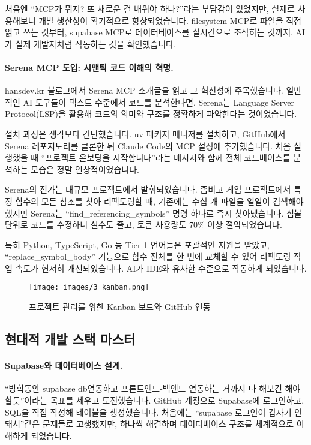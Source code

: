 처음엔 ``MCP가 뭐지? 또 새로운 걸 배워야 하나?''라는 부담감이 있었지만, 실제로 사용해보니 개발 생산성이 획기적으로 향상되었습니다. filesystem MCP로 파일을 직접 읽고 쓰는 것부터, supabase MCP로 데이터베이스를 실시간으로 조작하는 것까지, AI가 실제 개발자처럼 작동하는 것을 확인했습니다.

\paragraph{Serena MCP 도입: 시맨틱 코드 이해의 혁명.}
hansdev.kr 블로그에서 Serena MCP 소개글을 읽고 그 혁신성에 주목했습니다. 일반적인 AI 도구들이 텍스트 수준에서 코드를 분석한다면, Serena는 Language Server Protocol(LSP)을 활용해 코드의 의미와 구조를 정확하게 파악한다는 것이었습니다.

설치 과정은 생각보다 간단했습니다. uv 패키지 매니저를 설치하고, GitHub에서 Serena 레포지토리를 클론한 뒤 Claude Code의 MCP 설정에 추가했습니다. 처음 실행했을 때 ``프로젝트 온보딩을 시작합니다''라는 메시지와 함께 전체 코드베이스를 분석하는 모습은 정말 인상적이었습니다.

Serena의 진가는 대규모 프로젝트에서 발휘되었습니다. 좀비고 게임 프로젝트에서 특정 함수의 모든 참조를 찾아 리팩토링할 때, 기존에는 수십 개 파일을 일일이 검색해야 했지만 Serena는 ``find\_referencing\_symbols'' 명령 하나로 즉시 찾아냈습니다. 심볼 단위로 코드를 수정하니 실수도 줄고, 토큰 사용량도 70\% 이상 절약되었습니다.

특히 Python, TypeScript, Go 등 Tier 1 언어들은 포괄적인 지원을 받았고, ``replace\_symbol\_body'' 기능으로 함수 전체를 한 번에 교체할 수 있어 리팩토링 작업 속도가 현저히 개선되었습니다. AI가 IDE와 유사한 수준으로 작동하게 되었습니다.

\begin{figure}[h]
    \texttt{[image: images/3\_kanban.png]}
    \caption{프로젝트 관리를 위한 Kanban 보드와 GitHub 연동}
    \label{fig:kanban}
\end{figure}

\subsection{현대적 개발 스택 마스터}

\paragraph{Supabase와 데이터베이스 설계.}
``방학동안 supabase db연동하고 프론트엔드-백엔드 연동하는 거까지 다 해보긴 해야할듯''이라는 목표를 세우고 도전했습니다. GitHub 계정으로 Supabase에 로그인하고, SQL을 직접 작성해 테이블을 생성했습니다. 처음에는 ``supabase 로그인이 갑자기 안돼서''같은 문제들로 고생했지만, 하나씩 해결하며 데이터베이스 구조를 체계적으로 이해하게 되었습니다.

